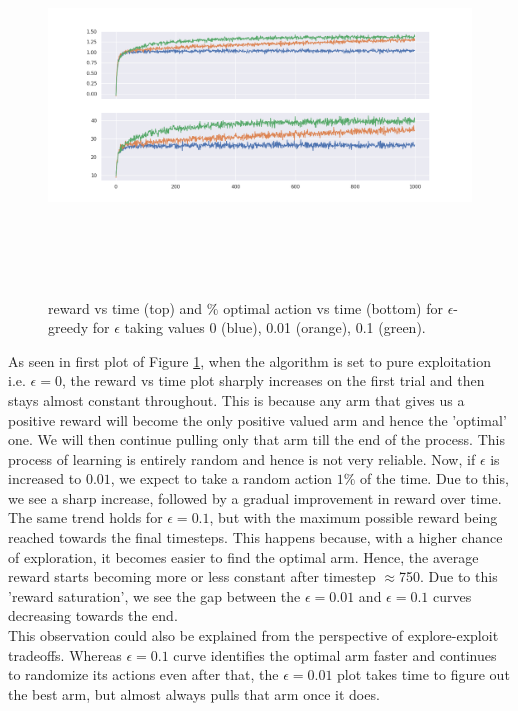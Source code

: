 \documentclass[12pt]{extarticle}
\begin{document}
\begin{figure}[H]
	\includegraphics[width=\textwidth, height=10cm]{epsilon-greedy.png}
	\caption{reward vs time (top) and $\%$ optimal action vs time (bottom) for $\epsilon$-greedy for $\epsilon$ taking values 0 (blue), 0.01 (orange), 0.1 (green).}
	\label{fig:epsilon-greedy}
\end{figure}

As seen in first plot of Figure \ref{fig:epsilon-greedy}, when the algorithm is set to pure exploitation i.e. $\epsilon = 0$, the reward vs time plot sharply increases on the first trial and then stays almost constant throughout. This is because any arm that gives us a positive reward will become the only positive valued arm and hence the 'optimal' one. We will then continue pulling only that arm till the end of the process. This process of learning is entirely random and hence is not very reliable. Now, if $\epsilon$ is increased to $0.01$, we expect to take a random action $1\%$ of the time. Due to this, we see a sharp increase, followed by a gradual improvement in reward over time. The same trend holds for $\epsilon = 0.1$, but with the maximum possible reward being reached towards the final timesteps. This happens because, with a higher chance of exploration, it becomes easier to find the optimal arm. Hence, the average reward starts becoming more or less constant after timestep $\approx$750. Due to this 'reward saturation', we see the gap between the $\epsilon=0.01$ and $\epsilon=0.1$ curves decreasing towards the end.\\

This observation could also be explained from the perspective of explore-exploit tradeoffs. Whereas $\epsilon=0.1$ curve identifies the optimal arm faster and continues to randomize its actions even after that, the $\epsilon=0.01$ plot takes time to figure out the best arm, but almost always pulls that arm once it does.\\
\end{document}
